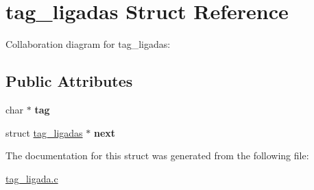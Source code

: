 \hypertarget{structtag__ligadas}{}\section{tag\+\_\+ligadas Struct Reference}
\label{structtag__ligadas}


Collaboration diagram for tag\+\_\+ligadas\+:
\subsection*{Public Attributes}
\begin{DoxyCompactItemize}
\item 
char $\ast$ {\bfseries tag}\hypertarget{structtag__ligadas_a61ca145adb52fbdd63ec1cd2b0a97d23}{}\label{structtag__ligadas_a61ca145adb52fbdd63ec1cd2b0a97d23}

\item 
struct \hyperlink{structtag__ligadas}{tag\+\_\+ligadas} $\ast$ {\bfseries next}\hypertarget{structtag__ligadas_a18eb1dc06215ad88b8ca522f45bacdb1}{}\label{structtag__ligadas_a18eb1dc06215ad88b8ca522f45bacdb1}

\end{DoxyCompactItemize}


The documentation for this struct was generated from the following file\+:\begin{DoxyCompactItemize}
\item 
\hyperlink{tag__ligada_8c}{tag\+\_\+ligada.\+c}\end{DoxyCompactItemize}
